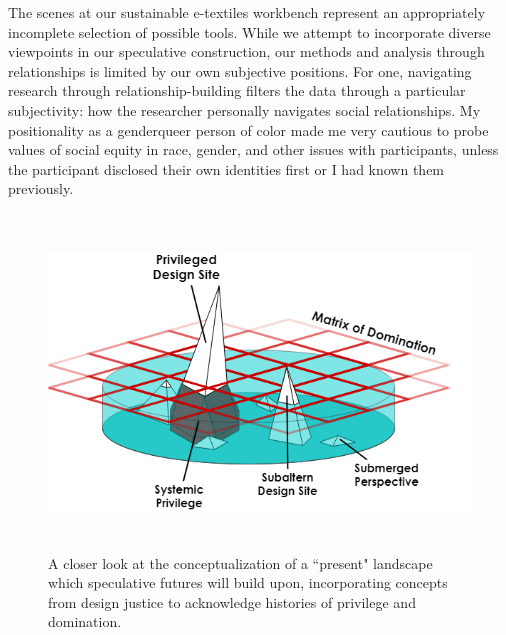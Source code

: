The scenes at our sustainable e-textiles workbench represent an appropriately incomplete selection of possible tools. While we attempt to incorporate diverse viewpoints in our speculative construction, our methods and analysis through relationships is limited by our own subjective positions.
For one, navigating research through relationship-building filters the data through a particular subjectivity: how the researcher personally navigates social relationships. My positionality as a genderqueer person of color made me very cautious to probe values of social equity in race, gender, and other issues with participants, unless the participant disclosed their own identities first or I had known them previously.

\begin{figure}[hb]
  \centering
  \includegraphics[height=3.5in]{figs/EST_Matrix of Dom_Submerged Perspectives.png}
  \caption[An illustration of the ``present'' point of the futures cone incorporating design justice concepts.]{A closer look at the conceptualization of a ``present" landscape which speculative futures will build upon, incorporating concepts from design justice to acknowledge histories of privilege and domination.}
  \label{fig:matrix-of-domination}
\end{figure}

